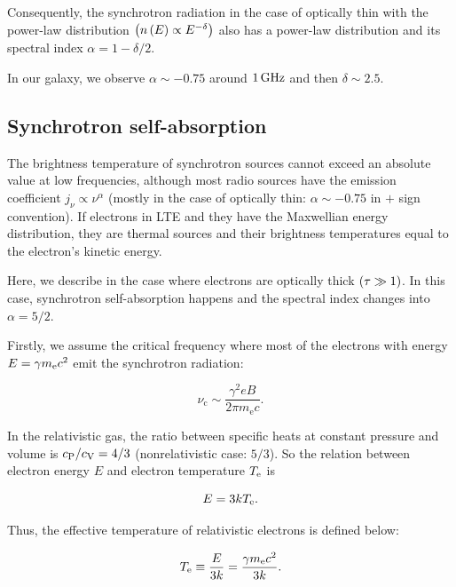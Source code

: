 Consequently, the synchrotron radiation in the case of optically thin with the power-law distribution $\left(n\left(E\right) \propto E^{-\delta}\right)$ also has a power-law distribution and its spectral index $\alpha = 1-\delta / 2$.

In our galaxy, we observe $\alpha\sim-0.75$ around $1\,\mathrm{GHz}$ and then $\delta \sim 2.5$.



\subsection{Synchrotron self-absorption}\label{synchrotronselfabsorption}

The brightness temperature of synchrotron sources cannot exceed an absolute value at low frequencies, although most radio sources have the emission coefficient $j_{\nu} \propto \nu^{\alpha}$ (mostly in the case of optically thin: $\alpha\sim-0.75$ in $+$ sign convention).
If electrons in LTE and they have the Maxwellian energy distribution, they are thermal sources and their brightness temperatures equal to the electron's kinetic energy.

Here, we describe in the case where electrons are optically thick $\left(\tau \gg 1\right)$.
In this case, synchrotron self-absorption happens and the spectral index changes into $\alpha = 5 / 2$.

Firstly, we assume the critical frequency where most of the electrons with energy $E = \gamma m_{\mathrm{e}} c^2$ emit the synchrotron radiation:

\begin{equation}\label{eq:essential_radio5n80}
    \nu_{\mathrm{c}} \sim \frac{\gamma^{2} e B}{2 \pi m_{\mathrm{e}} c}.
\end{equation}

In the relativistic gas, the ratio between specific heats at constant pressure and volume is $c_{\mathrm{P}} / c_{\mathrm{V}} = 4 / 3$ (nonrelativistic case: $5/3$).
So the relation between electron energy $E$ and electron temperature $T_{\mathrm{e}}$ is

\begin{equation}\label{eq:essential_radio5n82}
    E=3 k T_{\mathrm{e}}.
\end{equation}

Thus, the effective temperature of relativistic electrons is defined below:

\begin{equation}\label{eq:essential_radio5n83}
    T_{\mathrm{e}} \equiv \frac{E}{3 k}=\frac{\gamma m_{\mathrm{e}} c^2}{3 k}.
\end{equation}

